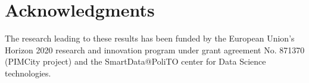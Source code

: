 \documentclass[acmsmall]{acmart}
\begin{document}



\maketitle







\section*{Acknowledgments}
The research leading to these results has been funded by the European Union's Horizon 2020 research and innovation program under grant agreement No. 871370 (PIMCity project) and the SmartData@PoliTO center for Data Science technologies.





\end{document}
